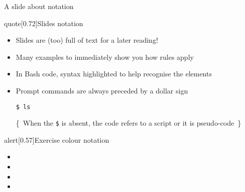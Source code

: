 \begin{frame}[fragile]{A slide about notation}
    \vspace{-5mm}
    \begin{varblock*}{quote}[0.72\textwidth]{Slides notation}
        \normalfont
        \begin{itemize}
            \setlength{\itemindent}{-1mm}
            \item Slides are (too) full of text for a later reading!
            \item Many examples to immediately show you how rules apply
            \item In Bash code, syntax highlighted to help recognise the elements
            \item Prompt commands are always preceded by a dollar sign 
                  \begin{lstlisting}[style=MyBash, numbers=none, aboveskip=2mm, xleftmargin=1mm, xrightmargin=12mm]
                      $ ls
                  \end{lstlisting}
                  {\tiny\{~When the \texttt{\$} is absent, the code refers to a script or it is pseudo-code~\}}
        \end{itemize}
    \end{varblock*}
    \begin{varblock*}{alert}[0.57\textwidth]{Exercise colour notation}
        \begin{itemize}
            \setlength{\itemindent}{-1mm}
            \item {}
            \item {}
            \item {}
            \item {}
        \end{itemize}
    \end{varblock*}
\end{frame}
